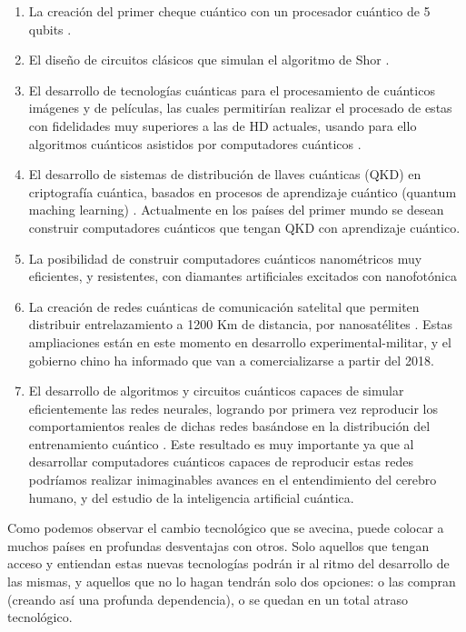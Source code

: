 \begin{enumerate}
    \item La creación del primer cheque cuántico con un procesador cuántico de 5 qubits \cite{Behera_2017}.
    \item El diseño de circuitos clásicos que simulan el algoritmo de Shor \cite{Johansson_2017}.
    \item El desarrollo de tecnologías cuánticas para el procesamiento de cuánticos imágenes y de películas, las cuales permitirían realizar el procesado de estas con fidelidades muy superiores a las de HD actuales, usando para ello algoritmos cuánticos asistidos por computadores cuánticos \cite{Yan_2017}.
    \item El desarrollo de sistemas de distribución de llaves cuánticas (QKD) en criptografía cuántica, basados en procesos de aprendizaje cuántico (quantum maching learning) \cite{Sheng_2017}. Actualmente en los países del primer mundo se desean construir computadores cuánticos que tengan QKD con aprendizaje cuántico.
    \item La posibilidad de construir computadores cuánticos nanométricos muy eficientes, y resistentes, con diamantes artificiales excitados con nanofotónica \cite{Zhang_2017}
    \item La creación de redes cuánticas de comunicación satelital que permiten distribuir entrelazamiento a 1200 Km de distancia, por nanosatélites \cite{Deng_2017}. Estas ampliaciones están en este momento en desarrollo experimental-militar, y el gobierno chino ha informado que van a comercializarse a partir del 2018.
    \item El desarrollo de algoritmos y circuitos cuánticos capaces de simular eficientemente las redes neurales, logrando por primera vez reproducir los comportamientos reales de dichas redes basándose en la distribución del entrenamiento cuántico \cite{Chen_2017}. Este resultado es muy importante ya que al desarrollar computadores cuánticos capaces de reproducir estas redes podríamos realizar inimaginables avances en el entendimiento del cerebro humano, y del estudio de la inteligencia artificial cuántica.
\end{enumerate}

Como podemos observar el cambio tecnológico que se avecina, puede colocar a muchos países en profundas desventajas con otros. Solo aquellos que tengan acceso y entiendan estas nuevas tecnologías podrán ir al ritmo del desarrollo de las mismas, y aquellos que no lo hagan tendrán solo dos opciones: o las compran (creando así una profunda dependencia), o se quedan en un total atraso tecnológico.

